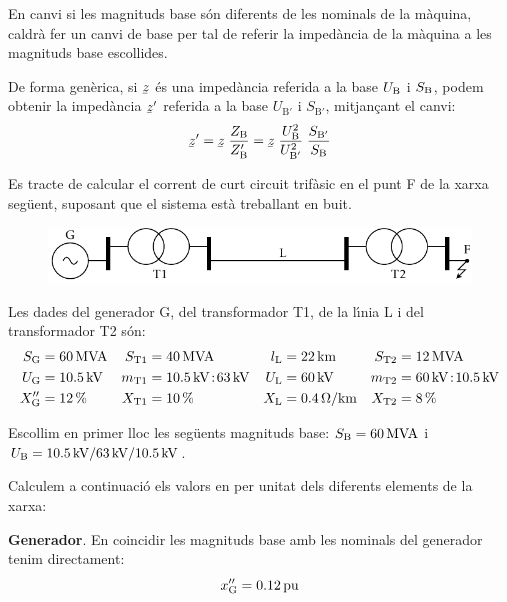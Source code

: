  En canvi si les magnituds base s\'{o}n diferents de les nominals de la m\`{a}quina, caldr\`{a} fer un canvi de base per tal de referir la imped\`{a}ncia de la m\`{a}quina a les magnituds base escollides.

De forma gen\`{e}rica, si $\cmplx{z}$ \'{e}s una imped\`{a}ncia referida a la base $U_\mathrm{B}$ i $S_\mathrm{B}$, podem obtenir la imped\`{a}ncia $\cmplx{z}'$ referida a la base $U_{\text{B}'}$ i $S_{\text{B}'}$, mitjan\c{c}ant el canvi:
\begin{equation}
   \cmplx{z}' = \cmplx{z} \; \frac{Z\ped{B}}{Z\ped{B}'} = \cmplx{z} \; \frac{U\ped{B}^2}{U_{\text{B}'}^2} \; \frac{S_{\text{B}'}}{S\ped{B}}\label{eq_pu_canvi_base}
\end{equation}

\begin{exemple}

Es tracte de calcular el corrent de curt circuit trif\`{a}sic en el punt F de la xarxa seg\"{u}ent, suposant
que el sistema est\`{a} treballant en buit.
\begin{figure}[h]
\centering
    \includegraphics{Imatges/Cap-Fonaments-pu-Circuit1.pdf}
\end{figure}

Les dades del generador G, del transformador T1, de la l\'{\i}nia L i del transformador T2 s\'{o}n:
\begin{align*}
   S_\mathrm{G} &= \SI{60}{MVA} & S_\mathrm{T1} &= \SI{40}{MVA} & l_\mathrm{L} &= \SI{22}{km} & S_\mathrm{T2} &=
   \SI{12}{MVA} \\
   U_\mathrm{G} &= \SI{10,5}{kV} & m_\mathrm{T1} &= \SI{10,5}{kV}\!:\!\SI{63}{kV} & U_\mathrm{L} &= \SI{60}{kV} & m_\mathrm{T2} &= \SI{60}{kV}\!:\!\SI{10,5}{kV} \\
   X''_\mathrm{G} &= \SI{12}{\%} & X_\mathrm{T1} &= \SI{10}{\%} & X_\mathrm{L} &= \SI{0,4}{\ensuremath{\mathrm{\Omega}}/km} & X_\mathrm{T2} &= \SI{8}{\%}
\end{align*}


Escollim en primer lloc les seg\"{u}ents magnituds base: $S_\mathrm{B} = \SI{60}{MVA}$ i $U_\mathrm{B}
= \SI{10,5}{kV} / \SI{63}{kV} / \SI{10,5}{kV}$.

Calculem a continuaci\'{o} els valors en per unitat dels diferents elements de la xarxa:

\textbf{Generador}. En coincidir les magnituds base amb les nominals del generador tenim
 directament:
\[
x''_\mathrm{G} = \SI{0,12}{pu}
\]


\end{exemple}
